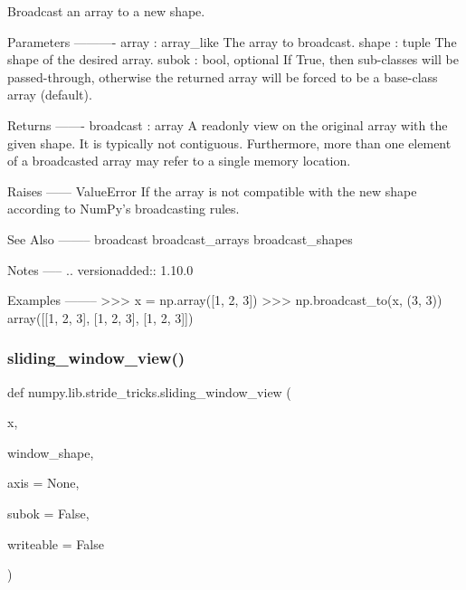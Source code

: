 \begin{DoxyVerb}Broadcast an array to a new shape.

Parameters
----------
array : array_like
    The array to broadcast.
shape : tuple
    The shape of the desired array.
subok : bool, optional
    If True, then sub-classes will be passed-through, otherwise
    the returned array will be forced to be a base-class array (default).

Returns
-------
broadcast : array
    A readonly view on the original array with the given shape. It is
    typically not contiguous. Furthermore, more than one element of a
    broadcasted array may refer to a single memory location.

Raises
------
ValueError
    If the array is not compatible with the new shape according to NumPy's
    broadcasting rules.

See Also
--------
broadcast
broadcast_arrays
broadcast_shapes

Notes
-----
.. versionadded:: 1.10.0

Examples
--------
>>> x = np.array([1, 2, 3])
>>> np.broadcast_to(x, (3, 3))
array([[1, 2, 3],
       [1, 2, 3],
       [1, 2, 3]])
\end{DoxyVerb}
 \mbox{\label{namespacenumpy_1_1lib_1_1stride__tricks_ad0af4109ea1a6f5614172e5d06f47934}} 
\subsubsection{\texorpdfstring{sliding\+\_\+window\+\_\+view()}{sliding\_window\_view()}}
{\footnotesize\ttfamily def numpy.\+lib.\+stride\+\_\+tricks.\+sliding\+\_\+window\+\_\+view (\begin{DoxyParamCaption}\item[{}]{x,  }\item[{}]{window\+\_\+shape,  }\item[{}]{axis = {\ttfamily None},  }\item[{}]{subok = {\ttfamily False},  }\item[{}]{writeable = {\ttfamily False} }\end{DoxyParamCaption})}

